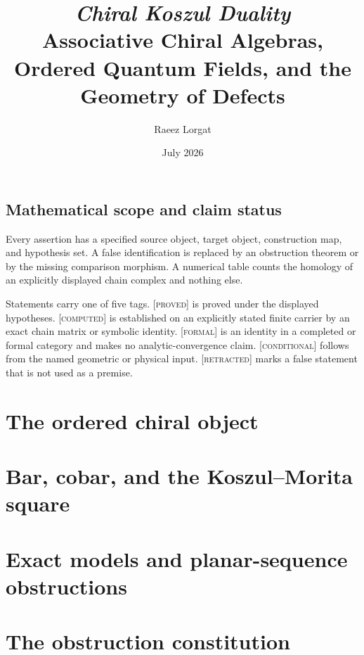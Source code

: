 \documentclass[11pt]{memoir}
\title{\texorpdfstring{%
  \textit{Chiral Koszul Duality}\\[0.5em]
  \large Associative Chiral Algebras, Ordered Quantum Fields, and the
  Geometry of Defects}{Chiral Koszul Duality: Associative Chiral Algebras,
  Ordered Quantum Fields, and the Geometry of Defects}}
\author{Raeez Lorgat}
\date{July 2026}
\providecommand{\StatusProved}{\textsc{[proved]}}
\providecommand{\StatusComputed}{\textsc{[computed]}}
\providecommand{\StatusFormal}{\textsc{[formal]}}
\providecommand{\StatusConditional}{\textsc{[conditional]}}
\providecommand{\StatusRetracted}{\textsc{[retracted]}}
\begin{document}
\frontmatter
\maketitle

\chapter*{Mathematical scope and claim status}

Every assertion has a specified source object, target object, construction
map, and hypothesis set. A false identification is replaced by an obstruction
theorem or by the missing comparison morphism. A numerical table counts the
homology of an explicitly displayed chain complex and nothing else.

Statements carry one of five tags. \StatusProved{} is proved under the
displayed hypotheses. \StatusComputed{} is established on an explicitly
stated finite carrier by an exact chain matrix or symbolic identity.
\StatusFormal{} is an identity in a completed or formal category and makes no
analytic-convergence claim. \StatusConditional{} follows from the named
geometric or physical input. \StatusRetracted{} marks a false statement that
is not used as a premise.

\tableofcontents

\mainmatter

\part{The ordered chiral object}



\part{Bar, cobar, and the Koszul--Morita square}



\part{Exact models and planar-sequence obstructions}



\part{The obstruction constitution}


\end{document}
